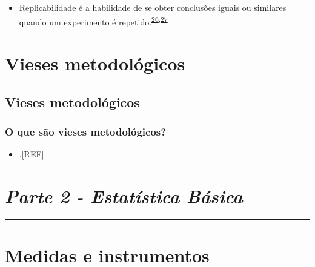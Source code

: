 \documentclass[
  a4paper,
]{book}
\providecommand{\tightlist}{%
  \setlength{\itemsep}{0pt}\setlength{\parskip}{0pt}}
\begin{document}
\begin{itemize}
\tightlist
\item
  Replicabilidade é a habilidade de se obter conclusões iguais ou similares quando um experimento é repetido.\textsuperscript{\protect\hyperlink{ref-hofner2015}{26},\protect\hyperlink{ref-mair2016}{27}}
\end{itemize}

\hypertarget{vieses-metodologicos}{%
\chapter{\texorpdfstring{\textbf{Vieses metodológicos}}{Vieses metodológicos}}\label{vieses-metodologicos}}

\hypertarget{vieses-metodologicos}{%
\section{Vieses metodológicos}\label{vieses-metodologicos}}

\hypertarget{o-que-suxe3o-vieses-metodoluxf3gicos}{%
\subsection{O que são vieses metodológicos?}\label{o-que-suxe3o-vieses-metodoluxf3gicos}}

\begin{itemize}
\tightlist
\item
  .{[}REF{]}
\end{itemize}


\hypertarget{parte-2---estatuxedstica-buxe1sica}{%
\chapter*{\texorpdfstring{\emph{Parte 2 - Estatística Básica}}{Parte 2 - Estatística Básica}}\label{parte-2---estatuxedstica-buxe1sica}}

\markboth{}{}
\par\noindent\rule{\textwidth}{0.05in}

\hypertarget{medidas-instrumentos}{%
\chapter{\texorpdfstring{\textbf{Medidas e instrumentos}}{Medidas e instrumentos}}\label{medidas-instrumentos}}
\end{document}
